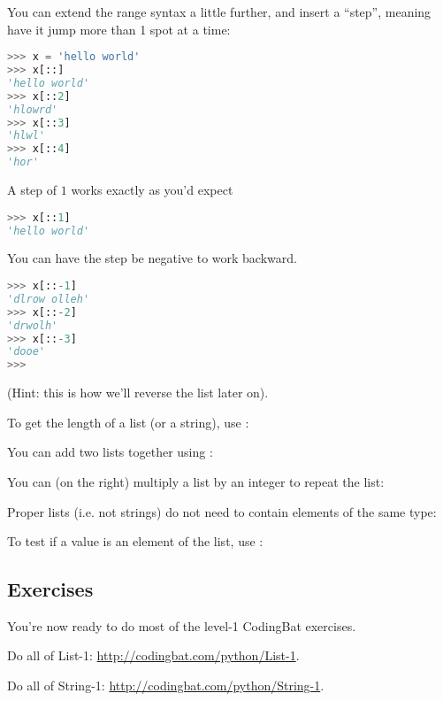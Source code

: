 You can extend the range syntax a little further, and insert a
``step'', meaning have it jump more than 1 spot at a time:

\begin{lstlisting}[language=Python]
>>> x = 'hello world'
>>> x[::]
'hello world'
>>> x[::2]
'hlowrd'
>>> x[::3]
'hlwl'
>>> x[::4]
'hor'
\end{lstlisting}

A step of $1$ works exactly as you'd expect

\begin{lstlisting}[language=Python]
>>> x[::1]
'hello world'
\end{lstlisting}

You can have the step be negative to work backward.

\begin{lstlisting}[language=Python]
>>> x[::-1]
'dlrow olleh'
>>> x[::-2]
'drwolh'
>>> x[::-3]
'dooe'
>>> 
\end{lstlisting}

(Hint: this is how we'll reverse the list later on).

To get the length of a list (or a string), use :


You can add two lists together using \code{+}:


You can (on the right) multiply a list by an integer to repeat the list:


Proper lists (i.e. not strings) do not need to contain elements of the
same type:


To test if a value is an element of the list, use :



\subsection{Exercises}

You're now ready to do most of the level-1 CodingBat exercises.

\begin{exercise}
  Do all of List-1: \url{http://codingbat.com/python/List-1}.
\end{exercise}
\begin{exercise}
  Do all of String-1: \url{http://codingbat.com/python/String-1}.
\end{exercise}


